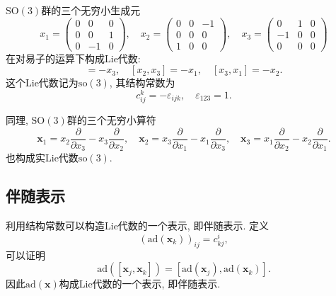 \documentclass[UTF8]{ctexart}
\begin{document}
$\mathrm{SO}(3)$群的三个无穷小生成元
\begin{equation}
  x_1 =
  \begin{pmatrix}
    0 & 0 & 0 \\
    0 & 0 & 1 \\
    0 & -1 & 0
  \end{pmatrix}, \quad x_2 =
  \begin{pmatrix}
    0 & 0 & -1 \\
    0 & 0 & 0 \\
    1 & 0 & 0
  \end{pmatrix}, \quad x_3 =
  \begin{pmatrix}
    0 & 1 & 0 \\
    -1 & 0 & 0 \\
    0 & 0 & 0
  \end{pmatrix}
\end{equation}
在对易子的运算下构成Lie代数:
\begin{equation}
  [x_1,x_2] = - x_3, \quad [x_2,x_3] = - x_1, \quad [x_3,x_1] = -x_2.
\end{equation}
这个Lie代数记为$\mathrm{so}(3)$, 其结构常数为
\begin{equation}
  c_{ij}^k = - \varepsilon_{ijk}, \quad \varepsilon_{123} = 1.
\end{equation}
 
同理, $\mathrm{SO}(3)$群的三个无穷小算符
\begin{equation}
  \bm{x}_1 = x_2 \frac{\partial}{\partial x_3} - x_3 \frac{\partial}{\partial x_2}, \quad \bm{x}_2 = x_3 \frac{\partial}{\partial x_1} - x_1 \frac{\partial}{\partial x_3}, \quad \bm{x}_3 = x_1 \frac{\partial}{\partial x_2} - x_2 \frac{\partial}{\partial x_1}.
\end{equation}
也构成实Lie代数$\mathrm{so}(3)$.

\subsection{伴随表示}
利用结构常数可以构造Lie代数的一个表示, 即伴随表示. 定义
\begin{equation}
  (\mathrm{ad}(\bm{x}_k))_{ij} = c_{kj}^i,
\end{equation}
可以证明
\begin{equation}
  \mathrm{ad}([\bm{x}_j,\bm{x}_k]) = [\mathrm{ad}(\bm{x}_j), \mathrm{ad}(\bm{x}_k)].
\end{equation}
因此$\mathrm{ad}(\bm{x})$构成Lie代数的一个表示, 即伴随表示.
\end{document}
